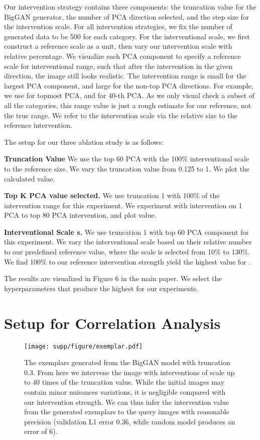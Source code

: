 \documentclass[final]{cvpr}
\begin{document}
\begin{subappendices}
Our intervention strategy contains three components: the truncation value for the BigGAN generator, the number of PCA direction selected, and the step size for the intervention scale. For all intervention strategies, we fix the number of generated data to be 500 for each category.
For the interventional scale, we first construct a reference scale as a unit, then vary our intervention scale with relative percentage. We visualize each PCA component to specify a reference scale for interventional range, such that after the intervention in the given direction, the image still looks realistic. The intervention range is small for the largest PCA component, and large for the non-top PCA directions. For example, we use  for topmost PCA, and  for 40-th PCA.  As we only visual check a subset of all the categories, this range value is just a rough estimate for our reference, not the true range. We refer to the intervention scale via the relative size to the reference intervention.

The setup for our three ablation study is as follows:

\textbf{Truncation Value} We use the top 60 PCA with the 100\% interventional scale to the reference size. We vary the truncation value from 0.125 to 1. We plot the calculated  value.

\textbf{Top K PCA value selected.} We use truncation 1 with 100\% of the intervention range for this experiment.  We experiment with intervention on 1 PCA to top 80 PCA intervention, and plot  value.

\textbf{Interventional Scale s. } We use truncation 1 with top 60 PCA component for this experiment.  We vary the interventional scale based on their relative number to our predefined reference value, where the scale is selected from 10\% to 130\%. We find 100\% to our reference intervention strength yield the highest value for  . 

The results are visualized in Figure 6 in the main paper. We select the hyperparameters that produce the highest  for our experiments. \section{Setup for Correlation Analysis}

\begin{figure*}
  \centering
  \texttt{[image: supp/figure/exemplar.pdf]}
  \vspace{-5mm}
  \caption{The exemplars generated from the BigGAN \cite{BigGAN} model with truncation 0.3. From here we intervene the image with interventions of scale up to 40 times of the truncation value. While the initial images may contain minor nuisances variations, it is negligible compared with our intervention strength.  We can thus infer the intervention value from the generated exemplars to the query images with reasonable precision (validation L1 error 0.36, while random model produces an error of 6).}
  \label{fig:exemplar}
\end{figure*}




\end{subappendices}
\end{document}
